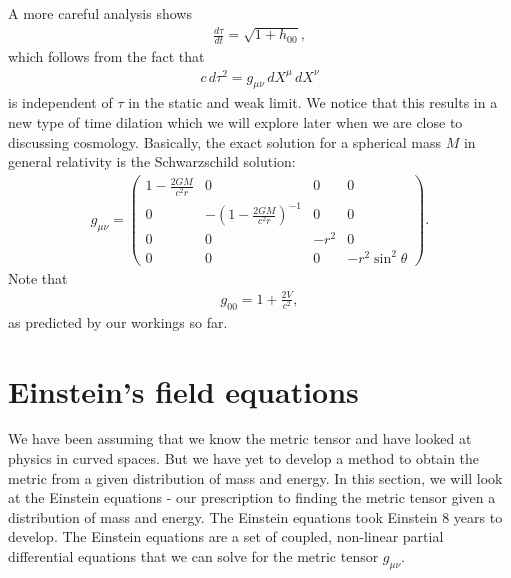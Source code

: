 \documentclass{article}
\theoremstyle{definition}
\begin{document}
A more careful analysis shows 
\begin{align*}
\frac{d\tau}{dt} = \sqrt{1+ h_{00}},
\end{align*}
which follows from the fact that  
\begin{align*}
c\,d\tau^2 = g_{\mu\nu}\,dX^\mu\,dX^\nu
\end{align*}
is independent of $\tau$ in the static and weak limit. We notice that this results in a new type of time dilation which we will explore later when we are close to discussing cosmology. Basically, the exact solution for a spherical mass $M$ in general relativity is the Schwarzschild solution:
\begin{align*}
g_{\mu\nu} = \begin{pmatrix}
1 - \frac{2GM}{c^2r} & 0 & 0 & 0 \\
0 & -\left(1-\frac{2GM}{c^2r} \right)^{-1} & 0 & 0\\
0 & 0 & -r^2 & 0\\
0 & 0 & 0 & -r^2\sin^2\theta
\end{pmatrix}.
\end{align*}
Note that
\begin{align*}
g_{00} = 1 + \frac{2V}{c^2},
\end{align*}
as predicted by our workings so far. 

\newpage

\section{Einstein's field equations}
We have been assuming that we know the metric tensor and have looked at physics in curved spaces. But we have yet to develop a method to obtain the metric from a given distribution of mass and energy. In this section, we will look at the Einstein equations - our prescription to finding the metric tensor given a distribution of mass and energy. The Einstein equations took Einstein 8 years to develop. The Einstein equations are a set of coupled, non-linear partial differential equations that we can solve for the metric tensor $g_{\mu\nu}$.\\
\end{document}
